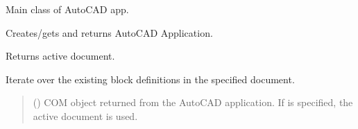 \documentclass[a4paper,10pt,english]{sphinxmanual}
\begin{document}
\begin{fulllineitems}
\label{\detokenize{API:pyacad.Autocad.Autocad}}
\pysigstartsignatures
{}
\pysigstopsignatures
\sphinxAtStartPar
Main class of AutoCAD app.

\begin{fulllineitems}
\label{\detokenize{API:pyacad.Autocad.Autocad.app}}
\pysigstartsignatures
{}
\pysigstopsignatures
\sphinxAtStartPar
Creates/gets and returns AutoCAD Application.

\end{fulllineitems}


\begin{fulllineitems}
\label{\detokenize{API:pyacad.Autocad.Autocad.doc}}
\pysigstartsignatures
{}
\pysigstopsignatures
\sphinxAtStartPar
Returns active document.

\end{fulllineitems}


\begin{fulllineitems}
\label{\detokenize{API:pyacad.Autocad.Autocad.iter_blocks}}
\pysigstartsignatures
{}
\pysigstopsignatures
\sphinxAtStartPar
Iterate over the existing block definitions in the specified document.
\begin{quote}\begin{description}
\sphinxAtStartPar
{} (\sphinxstyleliteralemphasis{\sphinxupquote{, }}) \textendash{} COM object returned from the AutoCAD application. If  is specified,
the active document is used.


\end{description}
\end{quote}
\end{fulllineitems}
\end{fulllineitems}
\end{document}
